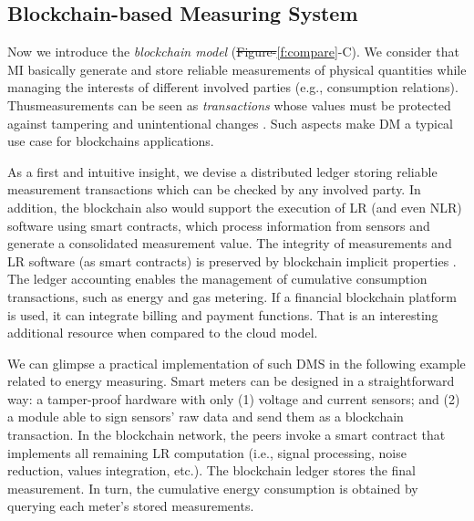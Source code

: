 \documentclass[journal]{IEEEtran}
\providecommand{\DIFadd}[1]{{\protect\color{blue}\uwave{#1}}} %
\providecommand{\DIFdel}[1]{{\protect\color{red}\sout{#1}}}                      %
\providecommand{\DIFaddbegin}{} %
\providecommand{\DIFaddend}{} %
\providecommand{\DIFdelbegin}{} %
\providecommand{\DIFdelend}{} %
\begin{document}
\subsection{Blockchain-based Measuring System}
\label{s:mi_blockchain}
Now we introduce the \emph{blockchain model} (\DIFdelbegin \DIFdel{Figure-}\DIFdelend \DIFaddbegin \DIFadd{Figure~}\DIFaddend \ref{f:compare}-C). 
We consider that MI basically generate and store reliable measurements of physical quantities while managing the interests of different involved parties (e.g., consumption relations). 
Thus\DIFaddbegin \DIFadd{, }\DIFaddend measurements can be seen as \emph{transactions} whose values must be protected against tampering and unintentional changes \cite{Esche2015}. Such aspects make DM a typical use case for blockchains applications. 

As a first and intuitive insight, we devise a distributed ledger storing reliable measurement transactions which can be checked by any involved party. 
In addition, the blockchain also would support the execution of LR (and even NLR) software using smart contracts, which process information from sensors and generate a consolidated measurement value. 
The integrity of measurements and LR software (as smart contracts) is preserved by blockchain implicit properties \cite{Zheng2017}. 
The ledger accounting enables the management of cumulative consumption transactions, such as energy and gas metering. If a financial blockchain platform is used, it can integrate billing and payment functions. 
That is an interesting additional resource when compared to the cloud model.

We can glimpse a practical implementation of such DMS in the following example related to energy measuring. 
Smart meters can be designed in a straightforward way: a tamper-proof hardware with only (1) voltage and current sensors; and (2) a module able to sign sensors' raw data and send them as a blockchain transaction. 
In the blockchain network, the peers invoke a smart contract that implements all remaining LR computation (i.e., signal processing, noise reduction, values integration, etc.). 
The blockchain ledger stores the final measurement. 
In turn, the cumulative energy consumption is obtained by querying each meter's stored measurements.
\end{document}
